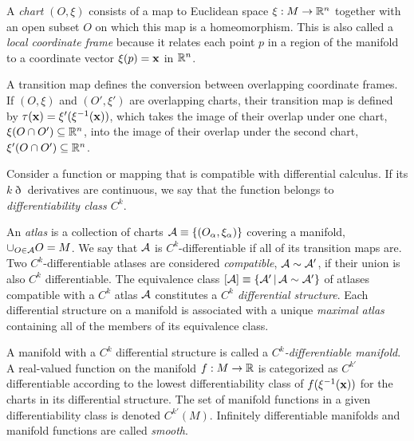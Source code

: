 \documentclass[11pt]{article}
\numberwithin{equation}{section}
\begin{document}
\begin{dfn}
A \textit{chart} $(O, \xi)$ consists of a map to Euclidean space $\xi:M\rightarrow\mb{R}^n$ together with an open subset $O$ on which this map is a homeomorphism.
This is also called a \textit{local coordinate frame} because it relates each point $p$ in a region of the manifold to a coordinate vector $\xi(p)=\bo{x}$ in $\mathbb{R}^n$.
\end{dfn}

\begin{dfn}
A transition map defines the conversion between overlapping coordinate frames.
If $(O, \xi)$ and $(O', \xi')$ are overlapping charts, their transition map is defined by $\ta(\bo{x})=\xi'(\xi^{-1}(\bo{x}))$, which takes the image of their overlap under one chart, $\xi(O\cap O')\subseteq \mb{R}^n$, into the image of their overlap under the second chart, $\xi'(O\cap O')\subseteq \mb{R}^n$.
\end{dfn}

\begin{dfn}
Consider a function or mapping that is compatible with differential calculus.
If its $k\eth$ derivatives are continuous, we say that the function belongs to \textit{differentiability class $C^k$}.
\end{dfn}


\begin{dfn}
An \textit{atlas} is a collection of charts $\mc{A}\equiv\{(O_\a, \xi_\a)\}$ covering a manifold,
$
  \cup_{O\in\mathcal{A}}
  O
=
  M
$.
We say that $\mathcal{A}$ is $C^k$-differentiable if all of its transition maps are.
Two $C^k$-differentiable atlases are considered \textit{compatible}, $\mathcal{A}\sim\mathcal{A}'$, if their union is also $C^k$ differentiable.
The equivalence class $[\mathcal{A}]\equiv\{\mathcal{A}'\,|\,\mathcal{A}\sim\mathcal{A}'\}$ of atlases compatible with a $C^k$ atlas $\mathcal{A}$ constitutes a \textit{$C^k$ differential structure}.
Each differential structure on a manifold is associated with a unique \textit{maximal atlas} containing all of the members of its equivalence class.
\end{dfn}

\begin{samepage}
\begin{dfn}
A manifold with a $C^k$ differential structure is called a \textit{$C^k$-differentiable manifold}.
A real-valued function on the manifold $f:M\rightarrow\mathbb{R}$ is categorized as $C^{k'}$ differentiable according to the lowest differentiability class of $f(\xi^{-1}(\bo{x}))$ for the charts in its differential structure.
The set of manifold functions in a given differentiability class is denoted $C^{k'}(M)$.
Infinitely differentiable manifolds and manifold functions are called \textit{smooth}.
\end{dfn}
\end{samepage}
\end{document}
